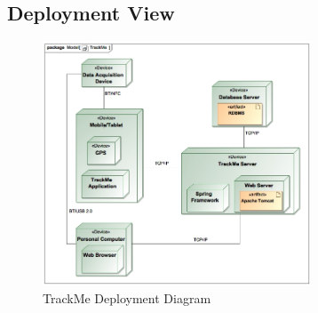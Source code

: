 \documentclass[a4paper]{article}
\begin{document}
\subsection{Deployment View}
\begin{figure}[!htpb]
    \centering
    \includegraphics[width=80mm,keepaspectratio]{images/UML/deployment_TrackMe.jpg}
    \caption{TrackMe Deployment Diagram}
    \label{fig:deployment_trackme}
\end{figure}    
\end{document}
